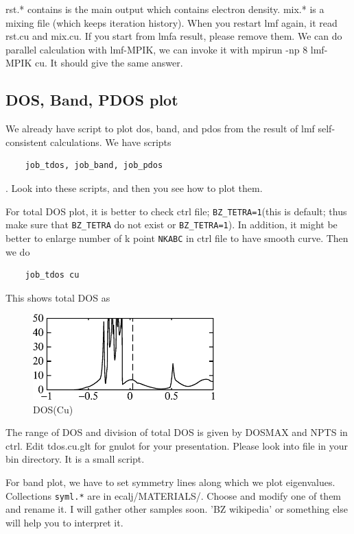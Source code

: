 rst.* contains is the main output which contains electron density.
mix.* is a mixing file (which keeps iteration history).
When you restart lmf again, it read rst.cu and mix.cu.
If you start from lmfa result, please remove them.
We can do parallel calculation with lmf-MPIK, 
we can invoke it with mpirun -np 8 lmf-MPIK cu. It should give the
same answer.



\subsection{DOS, Band, PDOS plot}

We already have script to plot dos, band, and pdos
from the result of lmf self-consistent calculations.
We have scripts
\begin{verbatim}
    job_tdos, job_band, job_pdos
\end{verbatim}
. Look into these scripts, and then you see how to plot them.

For total DOS plot, it is better to check ctrl file;
\verb+BZ_TETRA=1+(this is default; thus make sure that \verb+BZ_TETRA+ do
not exist or \verb+BZ_TETRA=1+). 
In addition, it might be better to enlarge number of k point
\verb+NKABC+ in ctrl file to have smooth curve. Then we do
\begin{verbatim}
    job_tdos cu
\end{verbatim}
This shows total DOS as
\begin{figure}[h]
 \begin{center}
  \includegraphics[width=70mm]{img/doscu.eps}
  \vspace{5mm}
  \caption{DOS(Cu)}
 \end{center}
\end{figure}
The range of DOS and division of total DOS is given by
DOSMAX and NPTS in ctrl. Edit tdos.cu.glt for gnulot for your presentation. 
Please look into  file in your bin directory. It is a small script.

For band plot, we have to set symmetry lines along which we plot eigenvalues.
Collections \verb+syml.*+ are in ecalj/MATERIALS/. 
Choose and modify one of them and rename it. 
I will gather other samples soon. 'BZ wikipedia' or something else
will help you to interpret it.

